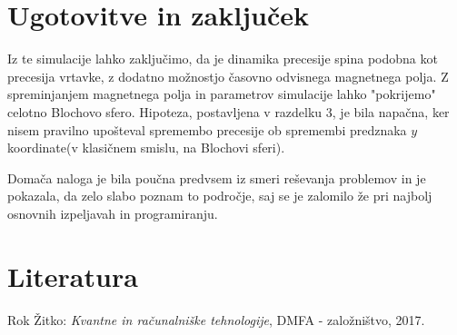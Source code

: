 \documentclass[12pt, a4paper]{article}
\begin{document}
\section{Ugotovitve in zaključek}
Iz te simulacije lahko zaključimo, da je dinamika precesije spina podobna kot precesija vrtavke, z dodatno možnostjo časovno odvisnega magnetnega polja. Z spreminjanjem magnetnega polja in parametrov simulacije lahko "pokrijemo" celotno Blochovo sfero. Hipoteza, postavljena v razdelku 3, je bila napačna, ker nisem pravilno upošteval spremembo precesije ob spremembi predznaka $y$ koordinate(v klasičnem smislu, na Blochovi sferi).

Domača naloga je bila poučna predvsem iz smeri reševanja problemov in je pokazala, da zelo slabo poznam to področje, saj se je zalomilo že pri najbolj osnovnih izpeljavah in programiranju.

\section{Literatura}
Rok Žitko: \textit{Kvantne in računalniške tehnologije}, DMFA - založništvo, 2017.
\end{document}
